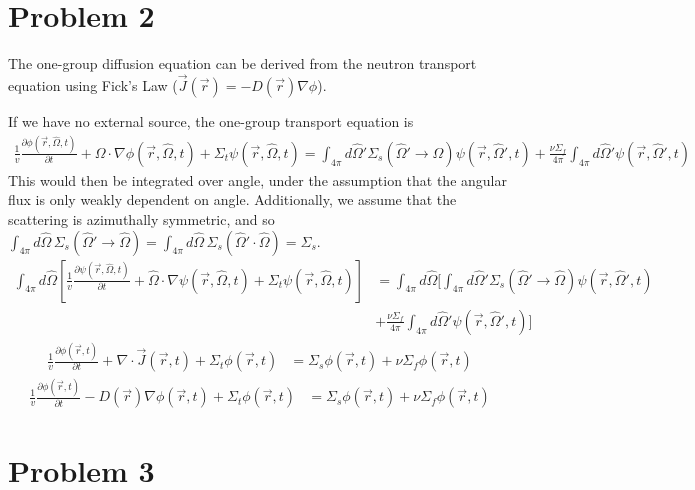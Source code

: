 \documentclass{article}
\newcommand{\p}{\partial}
\newcommand{\Xs}{\Sigma}
\newcommand{\Oov}{\frac{1}{v}}
\newcommand{\pos}{\vec{r}}
\newcommand{\cur}{\vec{J}}
\newcommand{\Oh}{\hat{\Omega}}
\newcommand{\intfp}{\int_{4\pi}}
\newcommand{\rt}{(\pos,t)}
\newcommand{\rOt}{(\pos,\Oh,t)}
\newcommand{\rOtprime}{(\pos,\Oh',t)}
\begin{document}

\section*{Problem 2}

The one-group diffusion equation can be derived from the neutron transport equation using Fick's Law ($\cur(\pos) = -D(\pos)\nabla \phi$). 

If we have no external source, the one-group transport equation is 
\begin{align*}
\Oov \frac{\p \phi\rOt}{\p t} + \Omega \cdot \nabla \phi \rOt + \Xs_t \psi\rOt = \intfp d\Oh' \Xs_s(\Oh' \rightarrow \Oh) \psi\rOtprime + \frac{\nu\Xs_f}{4\pi} \intfp d\Oh' \psi\rOtprime
\end{align*}
This would then be integrated over angle, under the assumption that the angular flux is only weakly dependent on angle. Additionally, we assume that the scattering is azimuthally symmetric, and so $\intfp d\Oh \, \Xs_s(\Oh' \rightarrow \Oh) = \intfp d\Oh \, \Xs_s(\Oh' \cdot \Oh) = \Xs_s$.
\begin{align*}
\intfp d\Oh \left[ \Oov \frac{\p \psi\rOt}{\p t} + \Oh \cdot \nabla \psi \rOt + \Xs_t \psi\rOt \right] &= \intfp d\Oh \bigg[ \intfp d\Oh' \Xs_s(\Oh' \rightarrow \Oh) \psi\rOtprime \\
&+ \frac{\nu\Xs_f}{4\pi} \intfp d\Oh' \psi\rOtprime \bigg]
\end{align*}
\begin{align*}
\Oov \frac{\p \phi\rt}{\p t} + \nabla \cdot \cur\rt + \Xs_t \phi\rt &=\Xs_s \phi\rt + \nu\Xs_f \phi\rt
\end{align*}
\begin{align*}
\Oov \frac{\p \phi\rt}{\p t} -D(\pos)\nabla \phi\rt + \Xs_t \phi\rt &=\Xs_s \phi\rt + \nu\Xs_f \phi\rt
\end{align*}



\section*{Problem 3}
\end{document}
